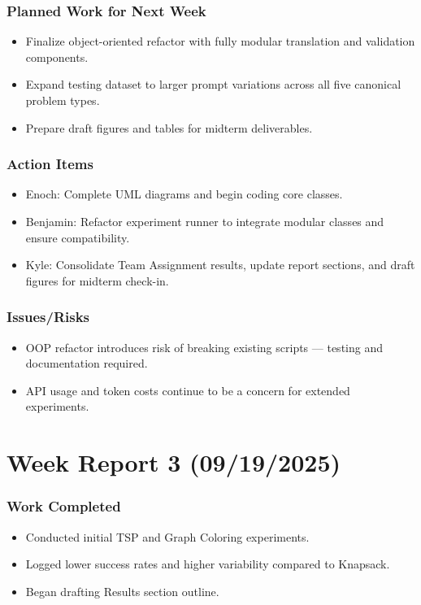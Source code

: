 \subsubsection{Planned Work for Next Week}

\begin{itemize}
  \item Finalize object-oriented refactor with fully modular translation and validation components. 
  \item Expand testing dataset to larger prompt variations across all five canonical problem types. 
  \item Prepare draft figures and tables for midterm deliverables. 
\end{itemize}

\subsubsection{Action Items}

\begin{itemize}
  \item Enoch: Complete UML diagrams and begin coding core classes. 
  \item Benjamin: Refactor experiment runner to integrate modular classes and ensure compatibility. 
  \item Kyle: Consolidate Team Assignment results, update report sections, and draft figures for midterm check-in. 
\end{itemize}

\subsubsection{Issues/Risks}

\begin{itemize}
  \item OOP refactor introduces risk of breaking existing scripts — testing and documentation required. 
  \item API usage and token costs continue to be a concern for extended experiments. 
\end{itemize}

\section{Week Report 3 (09/19/2025)}

\subsubsection{Work Completed}
\begin{itemize}
  \item Conducted initial TSP and Graph Coloring experiments. 
  \item Logged lower success rates and higher variability compared to Knapsack. 
  \item Began drafting Results section outline. 
\end{itemize}

